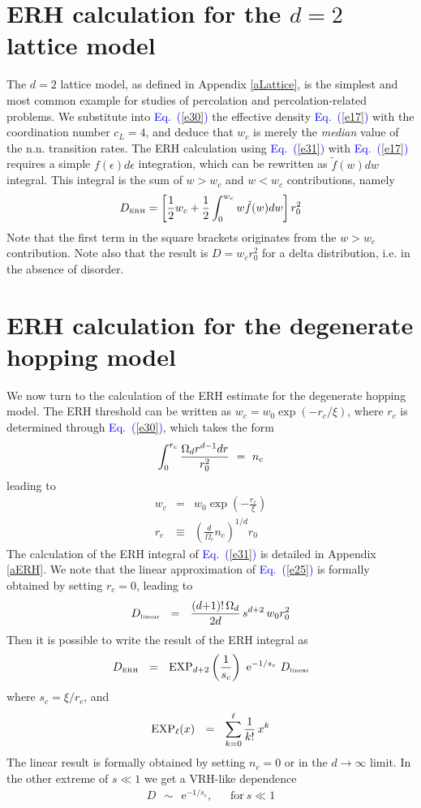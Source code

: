 \documentclass[aps,pre,floats,floatfix,twocolumn]{revtex4}
\newcommand{\eexp}{\mbox{e}^}
\newcommand{\tbox}[1]{\mbox{\tiny #1}}
\newcommand{\mylabel}[1]{\label{#1}}
\newcommand{\beq}{\begin{eqnarray}}
\newcommand{\eeq}{\end{eqnarray}}
\newcommand{\be}[1]{\begin{eqnarray}\ifthenelse{#1=-1}
{\nonumber}{\ifthenelse{#1=0}{}{\mylabel{e#1}}}}
\newcommand{\Eq}[1]{\textcolor{blue}{Eq.\!\!~(\ref{#1})}}
\newcommand{\rmrk}[1]{#1}
\begin{document}
\section{ERH calculation for the $d{=}2$ lattice model}

The $d{=}2$ lattice model, as defined in Appendix \ref{aLattice}, 
is the simplest and most common example 
for studies of percolation and percolation-related problems. 
%
We substitute into \Eq{e30} the effective density \Eq{e17}
with the coordination number ${c_L=4}$, and deduce 
that $w_c$ is merely the {\em median} value of the n.n. transition rates. 
%
The ERH calculation using \Eq{e31} with \Eq{e17} 
requires a simple $f(\epsilon)d\epsilon$ integration, 
which can be rewritten as $\tilde{f}(w)dw$ integral.  
This integral is the sum of ${w>w_c}$ and ${w<w_c}$ 
contributions, namely  
%
\be{37}
D_{\tbox{ERH}} =  \left[\frac{1}{2}w_c + \frac{1}{2}\int_0^{w_c} w\tilde{f}(w) dw\right]r_0^2
\eeq
% 
Note that the first term in the square brackets 
originates from the ${w>w_c}$ contribution.
Note also that the result is $D= w_c r_0^2$ for a delta 
distribution, i.e. in the absence of disorder. 


\section{ERH calculation for the degenerate hopping model}
\label{sN}

We now turn to the calculation of the ERH estimate for the
degenerate hopping model. The ERH threshold 
can be written as  $w_c=w_0\exp(-r_c/\xi)$, 
where $r_c$ is determined \rmrk{through} \Eq{e30}, 
which takes the form   
%
\be{735}
\int_0^{r_c} \frac{\Omega_d r^{d-1} dr}{r_0^2} \ = \  n_c 
\eeq
%
\rmrk{leading to} 
%
\beq
w_c &=& w_0\exp\left(-\frac{r_c}{\xi}\right) \\
r_c  &\equiv& \left(\frac{d}{\Omega_c}n_c\right)^{1/d}  r_0
\eeq
%
\rmrk{The calculation of the ERH integral of \Eq{e31} 
is detailed} in Appendix \ref{aERH}. We note that the 
linear approximation of \Eq{e25} is formally obtained 
by setting $r_c=0$, leading to 
%
\be{400}
D_{\tbox{linear}} \ \ = \ \  
\frac{(d{+}1)!\,\Omega_d}{2d} \, s^{d{+}2} \, w_0 r_0^2
\eeq
%
Then it is possible to write the result of the ERH integral as
%
\be{40}
D_{\tbox{ERH}} \ \ = \ \  
\mathrm{EXP}_{d{+}2}\left(\frac{1}{s_c}\right)  \  \eexp{-1/s_c}  \ D_{\tbox{linear}}
\eeq
%
where $s_c=\xi/r_c$, and 
%
\be{41}
\mathrm{EXP}_{\ell}(x) \ \ = \ \ \sum_{k=0}^{\ell} \frac{1}{k!} \, x^k
\eeq
%
The linear result is formally obtained 
by setting ${n_c=0}$ or in the $d\rightarrow\infty$ limit. 
In the other extreme of ${s\ll1}$ 
we get a VRH-like dependence
%
\beq
D \ \ \sim \ \ \eexp{-1/s_c}, \ \ \ \ \ \ \ \text{for} \ s\ll1 
\eeq
\end{document}
